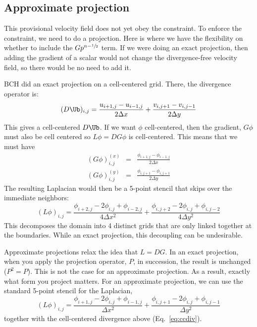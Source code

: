 \subsection{Approximate projection}

This provisional velocity field does not yet obey the constraint.  To
enforce the constraint, we need to do a projection.  Here is where we
have the flexibility on whether to include the $G p^{n-{\sfrac{1}{2}}}$ term.  If
we were doing an exact projection, then adding the gradient of a
scalar would not change the divergence-free velocity field, so there
would be no need to add it.

BCH did an exact projection on a cell-centered grid.  There, the
divergence operator is:
\begin{equation}
(D \Ub)_{i,j} = \frac{u_{i+1,j} - u_{i-1,j}}{2\Delta x} +
              \frac{v_{i,j+1} - v_{i,j-1}}{2\Delta y} \label{eq:ccdiv}
\end{equation}
This gives a cell-centered $D\Ub$.  If we want $\phi$ cell-centered, then
the gradient, $G\phi$ must also be cell centered so $L\phi = DG\phi$ is
cell-centered.  This means that we must have
\begin{eqnarray}
(G\phi)^{(x)}_{i,j} &=& \frac{\phi_{i+1,j} - \phi_{i-1,j}}{2\Delta x} \\
(G\phi)^{(y)}_{i,j} &=& \frac{\phi_{i,j+1} - \phi_{i,j+1}}{2\Delta y}
\end{eqnarray}
The resulting Laplacian would then be a 5-point stencil that skips over
the immediate neighbors:
\begin{equation}
(L\phi)_{i,j} = \frac{\phi_{i+2,j} -2\phi_{i,j} + \phi_{i-2,j}}{4 \Delta x^2} +
    \frac{\phi_{i,j+2} -2\phi_{i,j} + \phi_{i,j-2}}{4 \Delta y^2}
\end{equation}
This decomposes the domain into 4 distinct grids that are only linked
together at the boundaries.  While an exact projection, this decoupling
can be undesirable.

Approximate projections relax the idea that $L = DG$.  In an exact
projection, when you apply the projection operator, $P$, in
succession, the result is unchanged ($P^2 = P$).  This is not the case
for an approximate projection.  As a result, exactly what form you
project matters.  For an approximate projection, we can use the
standard 5-point stencil for the Laplacian,
\begin{equation}
(L\phi)_{i,j} = \frac{\phi_{i+1,j} -2\phi_{i,j} + \phi_{i-1,j}}{\Delta x^2} +
    \frac{\phi_{i,j+1} -2\phi_{i,j} + \phi_{i,j-1}}{\Delta y^2}
\end{equation}
together with the cell-centered divergence above (Eq.~\ref{eq:ccdiv}).


